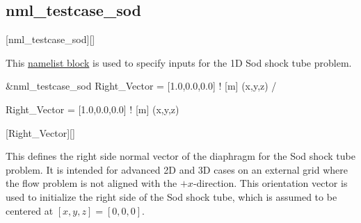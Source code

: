 \subsection{nml\_testcase\_sod}
\label{SEC:nml_testcase_sod}
\inp*[nmlTestcaseSod]{}[nml\_testcase\_sod][]

This \hyperref[SEC:User_Input]{namelist block}
is used to specify inputs for the 1D Sod shock tube problem.

\begin{nmlblocklst}[
,label={LST:nml_testcase_sod}
,caption={Namelist nml\_testcase\_sod.}
]
&nml_testcase_sod
  Right_Vector = [1.0,0.0,0.0]  ! [m] (x,y,z)
/
\end{nmlblocklst}


\begin{nmldescitem}
Right_Vector = [1.0,0.0,0.0]  ! [m] (x,y,z)
\end{nmldescitem}
[Right\_Vector][]

\begin{nmldescbody}
This defines the right side normal vector of the diaphragm for the
Sod shock tube problem.
%
It is intended for advanced 2D and 3D cases on an external grid
where the flow problem is not aligned with the $+x$-direction.
%
This orientation vector is used to initialize the right side of the
Sod shock tube, which is assumed to be centered at $[x,y,z]=[0,0,0]$.
\end{nmldescbody}


